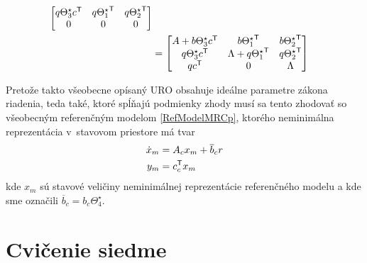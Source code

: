 \documentclass[a4paper, 10pt, ]{article}
\begin{document}
\begin{equation}
\begin{split}
\begin{bmatrix}
			q \Theta_3^\star c^{\mathsf{T}} & q {\Theta_1^\star}^{\mathsf{T}} & q {\Theta_2^\star}^{\mathsf{T}} \\
			0 & 0 & 0
		\end{bmatrix} \\
		&=
		\begin{bmatrix}
             A +  b \Theta_3^\star c^{\mathsf{T}}&
	    	 b {\Theta_1^\star}^{\mathsf{T}} &
	    	 b {\Theta_2^\star}^{\mathsf{T}} \\
	    	 q \Theta_3^\star c^{\mathsf{T}} &
	    	 \Lambda + q {\Theta_1^\star}^{\mathsf{T}} &
	    	 q {\Theta_2^\star}^{\mathsf{T}} \\
	    	 q c^{\mathsf{T}} & 0 & \Lambda
	 	\end{bmatrix}
	\end{split}
\end{equation}

Pretože takto všeobecne opísaný URO obsahuje ideálne parametre zákona riadenia, teda také, ktoré spĺňajú podmienky zhody musí sa tento zhodovať so všeobecným referenčným modelom \eqref{RefModelMRCp}, ktorého neminimálna reprezentácia v~stavovom priestore má tvar
\begin{subequations} \label{vsNeminimalRMMRCp}
	\begin{align}
		\dot x_m &= A_c x_m + \overline{b}_c r \\
		y_m &= c_c^{\mathsf{T}} x_m
	\end{align}
\end{subequations}
kde $x_m$ sú stavové veličiny neminimálnej reprezentácie referenčného modelu a kde sme označili $\overline{b}_c = b_c \Theta_4^\star$.













\section{Cvičenie siedme}
\label{cvicsiedme}
\end{document}
